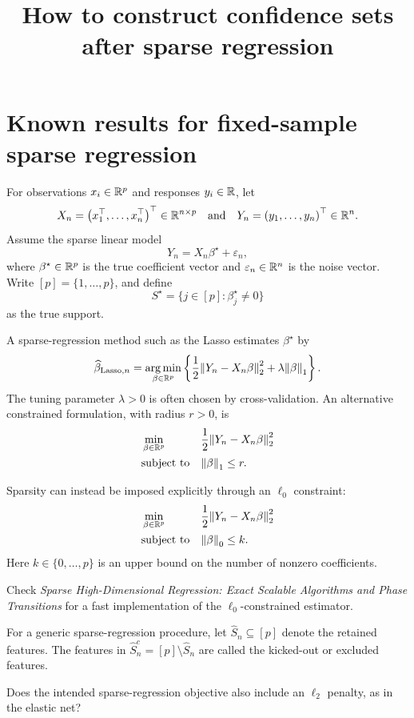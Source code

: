 \documentclass{wyqart}
\title{How to construct confidence sets after sparse regression}
\newcommand{\lasso}{\mathrm{Lasso}}
\newcommand{\yq}[1]{{\color{red} #1}}
\begin{document}
\maketitle

\section{Known results for fixed-sample sparse regression}

For observations $x_i\in\mathbb{R}^p$ and responses $y_i\in\mathbb{R}$,
let
$$
	X_n=\left(x_1^\top,\ldots,x_n^\top\right)^\top\in\mathbb{R}^{n\times p}
	\quad\text{and}\quad
	Y_n=\left(y_1,\ldots,y_n\right)^\top\in\mathbb{R}^n.
$$
Assume the sparse linear model
$$
	Y_n=X_n\beta^\star+\varepsilon_n,
$$
where $\beta^\star\in\mathbb{R}^p$ is the true coefficient vector and
$\varepsilon_n\in\mathbb{R}^n$ is the noise vector.
Write $[p]=\{1,\ldots,p\}$, and define
$$
	S^\star=\{j\in[p]:\beta_j^\star\neq 0\}
$$
as the true support.

A sparse-regression method such as the Lasso estimates $\beta^\star$ by
$$
	\widehat{\beta}_{\lasso,n}
	=
	\argmin_{\beta\in\Rf^p}
	\left\{
		\frac{1}{2}\norm{Y_n-X_n\beta}_2^2
		+
		\lambda\norm{\beta}_1
	\right\}.
$$
The tuning parameter $\lambda>0$ is often chosen by cross-validation.
An alternative constrained formulation, with radius $r>0$, is
\begin{align*}
	&\min_{\beta\in\mathbb{R}^p}
	&&\frac{1}{2}\norm{Y_n-X_n\beta}_2^2 \\
	&\text{subject to}
	&&\norm{\beta}_1\leq r.
\end{align*}

Sparsity can instead be imposed explicitly through an $\ell_0$ constraint:
\begin{align*}
	&\min_{\beta\in\mathbb{R}^p}
	&&\frac{1}{2}\norm{Y_n-X_n\beta}_2^2 \\
	&\text{subject to}
	&&\norm{\beta}_0\leq k.
\end{align*}
Here $k\in\{0,\ldots,p\}$ is an upper bound on the number of nonzero
coefficients.

\yq{Check \emph{Sparse High-Dimensional Regression:
Exact Scalable Algorithms and Phase Transitions} for a fast implementation
of the $\ell_0$-constrained estimator.}

For a generic sparse-regression procedure,
let $\widehat{S}_n\subseteq[p]$ denote the retained features.
The features in $\widehat{S}_n^c=[p]\setminus\widehat{S}_n$ are called the
kicked-out or excluded features.

\yq{Does the intended sparse-regression objective also include an
$\ell_2$ penalty, as in the elastic net?}
\end{document}
